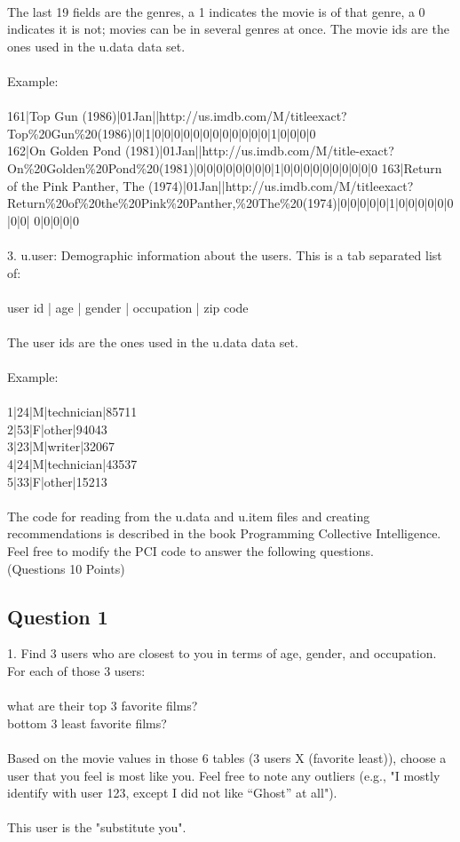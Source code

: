 \documentclass[10pt,letterpaper]{article}
\begin{document}
\\
The last 19 fields are the genres, a 1 indicates the movie is of that genre, a 0 indicates it is not; movies can be in several genres at once. The movie ids are the ones used in the u.data data set.\\
\\
Example:\\
\\
161|Top Gun (1986)|01\-Jan||http://us.imdb.com/M/title\-exact?Top\%20Gun\%20(1986)|0|1|0|0|0|0|0|0|0|0|0|0|0|0|1|0|0|0|0\\
162|On Golden Pond (1981)|01\-Jan||http://us.imdb.com/M/title-exact?On\%20Golden\%20Pond\%20(1981)|0|0|0|0|0|0|0|0|1|0|0|0|0|0|0|0|0|0|0 
163|Return of the Pink Panther, The (1974)|01\-Jan||http://us.imdb.com/M/title\-exact?Return\%20of\%20the\%20Pink\%20Panther,\%20The\%20(1974)|0|0|0|0|0|1|0|0|0|0|0|0|0|0| 0|0|0|0|0\\
\\
3.  u.user: Demographic information about the users. This is a tab separated list of:\\
\\
user id | age | gender | occupation | zip code\\
\\
The user ids are the ones used in the u.data data set.\\
\\
Example:\\
\\
1|24|M|technician|85711\\ 
2|53|F|other|94043\\
3|23|M|writer|32067\\
4|24|M|technician|43537\\ 
5|33|F|other|15213\\
\\
The code for reading from the u.data and u.item files and creating recommendations is described in the book Programming Collective Intelligence.  Feel free to modify the PCI code to answer the following questions.\\
(Questions 10 Points)\\
\subsection{Question 1}
1.  Find 3 users who are closest to you in terms of age, gender, and occupation.  For each of those 3 users:\\
\\
\- what are their top 3 favorite films?\\
\- bottom 3 least favorite films?\\
\\
Based on the movie values in those 6 tables (3 users X (favorite least)), choose a user that you feel is most like you.  Feel free to note any outliers (e.g., "I mostly identify with user 123, except I did not like ``Ghost'' at all").\\  
\\
This user is the "substitute you".\\
\\  
\end{document}
